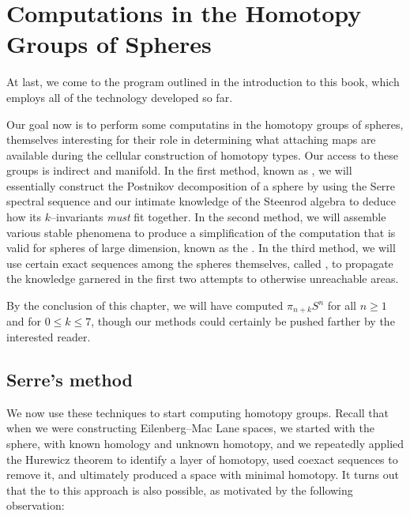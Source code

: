 
\chapter{Computations in the Homotopy Groups of Spheres}\label{ComputationsChapter}

At last, we come to the program outlined in the introduction to this book, which employs all of the technology developed so far.

Our goal now is to perform some computatins in the homotopy groups of spheres, themselves interesting for their role in determining what attaching maps are available during the cellular construction of homotopy types.
Our access to these groups is indirect and manifold.
In the first method, known as , we will essentially construct the Postnikov decomposition of a sphere by using the Serre spectral sequence and our intimate knowledge of the Steenrod algebra to deduce how its $k$--invariants \emph{must} fit together.
In the second method, we will assemble various stable phenomena to produce a simplification of the computation that is valid for spheres of large dimension, known as the .
In the third method, we will use certain exact sequences among the spheres themselves, called , to propagate the knowledge garnered in the first two attempts to otherwise unreachable areas.

By the conclusion of this chapter, we will have computed $\pi_{n+k} S^n$ for all $n \ge 1$ and for $0 \le k \le 7$, though our methods could certainly be pushed farther by the interested reader.




\section{Serre's method}\label{SerresMethod}

We now use these techniques to start computing homotopy groups.
Recall that when we were constructing Eilenberg--Mac Lane spaces, we started with the sphere, with known homology and unknown homotopy, and we repeatedly applied the Hurewicz theorem to identify a layer of homotopy, used coexact sequences to remove it, and ultimately produced a space with minimal homotopy.
It turns out that the  to this approach is also possible, as motivated by the following observation:

